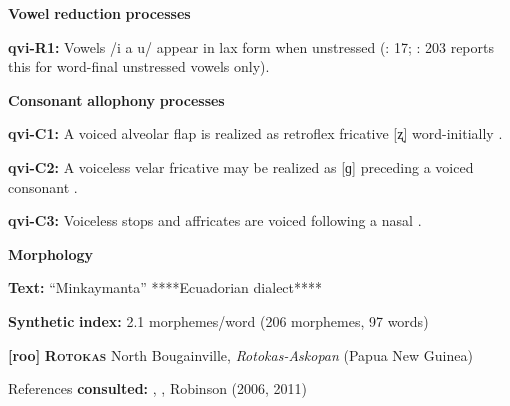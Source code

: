 \begin{styleBody}
\textbf{Vowel} \textbf{reduction} \textbf{processes}
\end{styleBody}

\begin{styleBody}
\textbf{qvi-R1:} Vowels /i a u/ appear in lax form when unstressed (\citealt{Jake1983}: 17; \citealt{Cole1982}: 203 reports this for word-final unstressed vowels only).
\end{styleBody}

\begin{styleBody}
\textbf{Consonant} \textbf{allophony} \textbf{processes}
\end{styleBody}

\begin{styleBody}
\textbf{qvi-C1:} A voiced alveolar flap is realized as retroflex fricative [ʐ] word-initially \citep[202]{Cole1982}.
\end{styleBody}

\begin{styleBody}
\textbf{qvi-C2:} A voiceless velar fricative may be realized as [ɡ] preceding a voiced consonant \citep[201]{Cole1982}.
\end{styleBody}

\begin{styleBody}
\textbf{qvi-C3:} Voiceless stops and affricates are voiced following a nasal \citep[200]{Cole1982}.
\end{styleBody}

\begin{styleBody}
\textbf{Morphology}
\end{styleBody}

\begin{styleBody}
\textbf{Text:} “Minkaymanta” \citep[442-55]{Carpenter1982} ****Ecuadorian dialect****
\end{styleBody}

\begin{styleBody}
\textbf{Synthetic} \textbf{index:} 2.1 morphemes/word (206 morphemes, 97 words)
\end{styleBody}

\begin{styleBody}
\textbf{[roo]}   \textbf{\textsc{Rotokas}}  North Bougainville, \textit{Rotokas-Askopan} (Papua New Guinea)
\end{styleBody}

\begin{styleBody}
References \textbf{consulted:} \citet{FirchowFirchow1969}, \citet{FirchowEtAl1973}, Robinson (2006, 2011) 
\end{styleBody}

